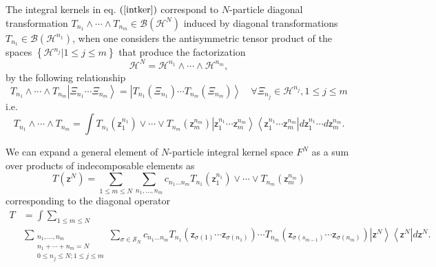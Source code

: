 \documentclass[aps,preprint]{revtex4}%
\begin{document}
The integral kernels in eq. $\left(  \ref{intker}\right)  $ correspond to
$N$-particle diagonal transformation $T_{n_{1}}\wedge\cdots\wedge T_{n_{m}}%
\in\mathcal{B}\left(  \mathcal{H}^{N}\right)  $ induced by diagonal
transformations $T_{n_{1}}\in\mathcal{B}\left(  \mathcal{H}^{n_{1}}\right)  $,
when one considers the antisymmetric tensor product of the spaces $\left\{
\mathcal{H}^{n_{j}}|1\leq j\leq m\right\}  $ that produce the factorization
\begin{equation}
\mathcal{H}^{N}=\mathcal{H}^{n_{1}}\wedge\cdots\wedge\mathcal{H}^{n_{m}},
\end{equation}
by the following relationship
\begin{equation}
T_{n_{1}}\wedge\cdots\wedge T_{n_{m}}\left\vert \Xi_{n_{1}}\cdots\Xi_{n_{m}%
}\right\rangle =\left\vert T_{n_{1}}\left(  \Xi_{n_{1}}\right)  \cdots
T_{n_{m}}\left(  \Xi_{n_{m}}\right)  \right\rangle \quad\forall\Xi_{n_{j}}%
\in\mathcal{H}^{n_{j}},1\leq j\leq m
\end{equation}
i.e.%
\begin{equation}
T_{n_{1}}\wedge\cdots\wedge T_{n_{m}}=\int T_{n_{1}}\left(  \mathsf{z}%
_{1}^{n_{1}}\right)  \vee\cdots\vee T_{n_{m}}\left(  \mathsf{z}_{m}^{n_{m}%
}\right)  \left\vert \mathsf{z}_{1}^{n_{1}}\cdots\mathsf{z}_{m}^{n_{m}%
}\right\rangle \left\langle \mathsf{z}_{1}^{n_{1}}\cdots\mathsf{z}_{m}^{n_{m}%
}\right\vert d\mathsf{z}_{1}^{n_{1}}\cdots d\mathsf{z}_{m}^{n_{m}}.
\end{equation}


We can expand a general element of $N$-particle integral kernel space $F^{N}$
as a sum over products of indecomposable elements as
\begin{equation}
T\left(  \mathsf{z}^{N}\right)  =%
{\displaystyle\sum\limits_{1\leq m\leq N}}
{\displaystyle\sum\limits_{n_{1},\ldots,n_{m}}}
c_{n_{1}\ldots n_{m}}T_{n_{1}}\left(  \mathsf{z}_{1}^{n_{1}}\right)
\vee\cdots\vee T_{n_{m}}\left(  \mathsf{z}_{m}^{n_{m}}\right)
\label{kerexpan}%
\end{equation}
corresponding to the diagonal operator
\begin{align}
T  &  =\int\sum_{1\leq m\leq N}\nonumber\\
&
{\displaystyle\sum\limits_{\substack{n_{1},\ldots,n_{m} \\n_{1}+\cdots+n_{m}=N
\\0\leq n_{j}\leq N;1\leq j\leq m}}}
\sum_{\sigma\in\mathcal{S}_{N}}c_{n_{1}\ldots n_{m}}T_{n_{1}}\left(
\mathsf{z}_{\sigma\left(  1\right)  }\cdots\mathsf{z}_{\sigma\left(
n_{1}\right)  }\right)  \cdots T_{n_{m}}\left(  \mathsf{z}_{\sigma\left(
s_{m-1}\right)  }\cdots\mathsf{z}_{\sigma\left(  n_{m}\right)  }\right)
\left\vert \mathsf{z}^{N}\right\rangle \left\langle \mathsf{z}^{N}\right\vert
d\mathsf{z}^{N}.
\end{align}
\end{document}
